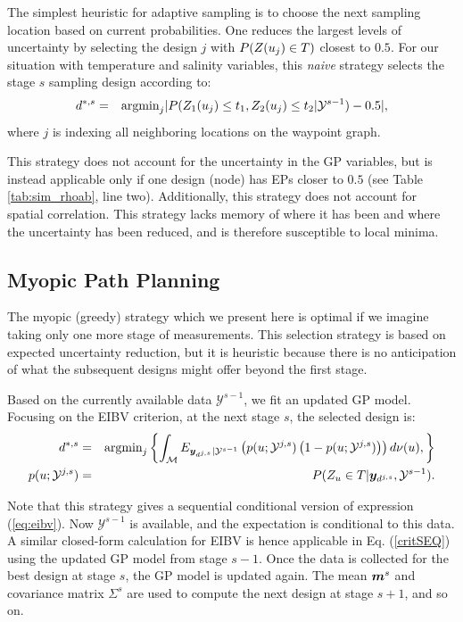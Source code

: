 \documentclass[aoas]{imsart}
\begin{document}
The simplest heuristic for adaptive sampling is to choose the next
sampling location based on current probabilities. One reduces the largest levels of uncertainty by selecting the design $j$ with $P(Z(u_j) \in T)$ closest to $0.5$.
For our situation with temperature and salinity variables, this {\it{naive}} strategy selects the stage $s$ sampling design according to:
\begin{eqnarray}\label{critNaive}
    d^{*,s} &=& \mbox{argmin}_{j} |P(Z_1(\x_j) \leq t_1, Z_2(\x_j) \leq t_2 | \mathcal{Y}^{s-1})-0.5|, \nonumber
\end{eqnarray}
where $j$ is indexing all neighboring locations on the waypoint graph.

This strategy does not account for the uncertainty in the GP variables, but is instead applicable only if one design (node) has EPs closer to
$0.5$ (see Table \ref{tab:sim_rhoab}, line two). Additionally, this strategy does not
account for spatial correlation. This strategy lacks memory of where
it has been and where the uncertainty has been reduced, and is therefore
susceptible to local minima.

\subsection{Myopic Path Planning}
\label{sec:myopic}

The myopic (greedy) strategy which we present here is optimal if we
imagine taking only one more stage of measurements. This selection
strategy is based on expected uncertainty reduction, but it is heuristic because there is no anticipation of what the subsequent designs might
offer beyond the first stage.

Based on the currently available data $\mathcal{Y}^{s-1}$, we
fit an updated GP model. Focusing on the EIBV criterion, at the next stage $s$, the selected design is:
\begin{eqnarray}\label{critSEQ}
    d^{*,s} &=& \mbox{argmin}_{j} \left\{ \int_{\mathcal{M}} E_{\by_{d^{j,s}}|\mathcal{Y}^{s-1}} \left( p(\x;\mathcal{Y}^{j,s})\left( 1-p(\x;\mathcal{Y}^{j,s})\right) \right) d\mes(u), \right\} \\
    p(\x;\mathcal{Y}^{j,s}) &=& P(Z_u \in T |\by_{d^{j,s}},\mathcal{Y}^{s-1}). \nonumber
\end{eqnarray}

Note that this strategy gives a sequential conditional version of
expression (\ref{eq:eibv}). Now $\mathcal{Y}^{s-1}$ is available, and
the expectation is conditional to this data. A similar closed-form calculation
for EIBV is hence applicable in Eq. (\ref{critSEQ}) using the
updated GP model from stage $s-1$. Once the data is collected for the
best design at stage $s$, the GP model is updated again. The mean ${\boldsymbol m}^{s}$ and
covariance matrix $\Sigma^{s}$ are used to compute the next design at
stage $s+1$, and so on.
\end{document}
